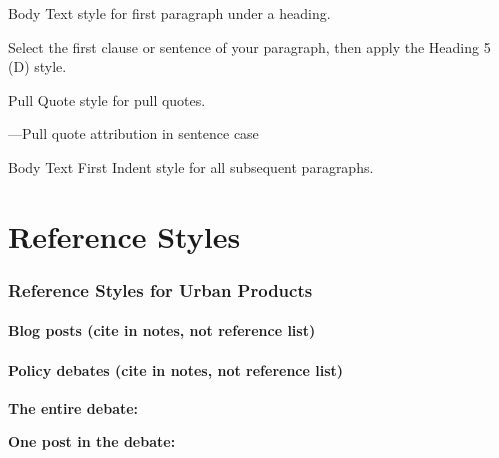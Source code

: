 Body Text style for first paragraph under a heading.

 Select the first clause or sentence of your paragraph, then apply the Heading 5 (D) style. 

Pull Quote style for pull quotes.

---Pull quote attribution in sentence case

Body Text First Indent style for all subsequent paragraphs.


\newpage
\part{Reference Styles}

\section{Reference Styles for Urban Products}

\subsection{Blog posts (cite in notes, not reference list)}

\subsection{Policy debates (cite in notes, not reference list)}

\textbf{The entire debate:}

\textbf{One post in the debate:}

\cite{Ful83}